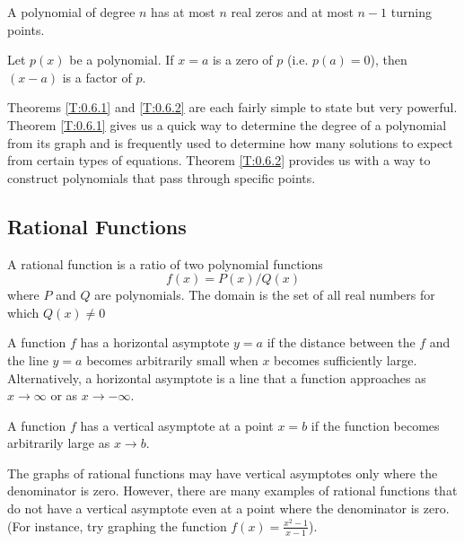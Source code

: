 \begin{theorem}
	A polynomial of degree $n$ has at most $n$ real zeros and at most $n-1$ turning points.\label{T:0.6.1}
\end{theorem}

\begin{theorem}\label{T:0.6.2}
	Let $p(x)$ be a polynomial.  If $x = a$ is a zero of $p$ (i.e. $p(a)=0$), then $(x-a)$ is a factor of $p$.
\end{theorem}

Theorems \ref{T:0.6.1} and \ref{T:0.6.2} are each fairly simple to state but very powerful.  Theorem \ref{T:0.6.1} gives us a quick way to determine the degree of a polynomial from its graph and is frequently used to determine how many solutions to expect from certain types of equations.  
Theorem \ref{T:0.6.2} provides us with a way to construct polynomials that pass through specific points.  



\subsection*{Rational Functions}

\begin{definition}
	A rational function is a ratio of two polynomial functions
		\[ 
			f(x) = P(x)/Q(x)
		\]
	where $P$ and $Q$ are polynomials.  The domain is the set of all real numbers for which $Q(x)\ne 0$
\end{definition}

\begin{definition}
	A function $f$ has a horizontal asymptote $y = a$ if the distance between the $f$ and the line $y=a$ becomes arbitrarily small when $x$ becomes sufficiently large.
	Alternatively, a horizontal asymptote is a line that a function approaches as $x \to \infty$ or as $x \to -\infty$. 
\end{definition}

\begin{definition}
    A function $f$ has a vertical asymptote at a point $x = b$ if the function becomes arbitrarily large as $x \to b$.
\end{definition}

The graphs of rational functions may have vertical asymptotes only where the denominator is zero.  However, there are many examples of rational functions that do not have a vertical asymptote even at a point where the denominator is zero. (For instance, try graphing the function $f(x)=\displaystyle{\frac{x^{2}-1}{x-1}}$).

